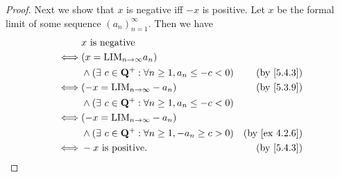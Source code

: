 \begin{proof}
  Next we show that \(x\) is negative iff \(-x\) is positive.
  Let \(x\) be the formal limit of some sequence \((a_n)_{n = 1}^{\infty}\).
  Then we have
  \begin{align*}
         & x \text{ is negative}                                                                         \\
    \iff & (x = \text{LIM}_{n \to \infty} a_n)                                                           \\
         & \land (\exists\ c \in \Q^+ : \forall n \geq 1, a_n \leq -c < 0) & \text{(by \cref{5.4.3})}    \\
    \iff & (-x = \text{LIM}_{n \to \infty} -a_n)                           & \text{(by \cref{5.3.9})}    \\
         & \land (\exists\ c \in \Q^+ : \forall n \geq 1, a_n \leq -c < 0)                               \\
    \iff & (-x = \text{LIM}_{n \to \infty} -a_n)                                                         \\
         & \land (\exists\ c \in \Q^+ : \forall n \geq 1, -a_n \geq c > 0) & \text{(by \cref{ex 4.2.6})} \\
    \iff & -x \text{ is positive}.                                         & \text{(by \cref{5.4.3})}
  \end{align*}


\end{proof}
